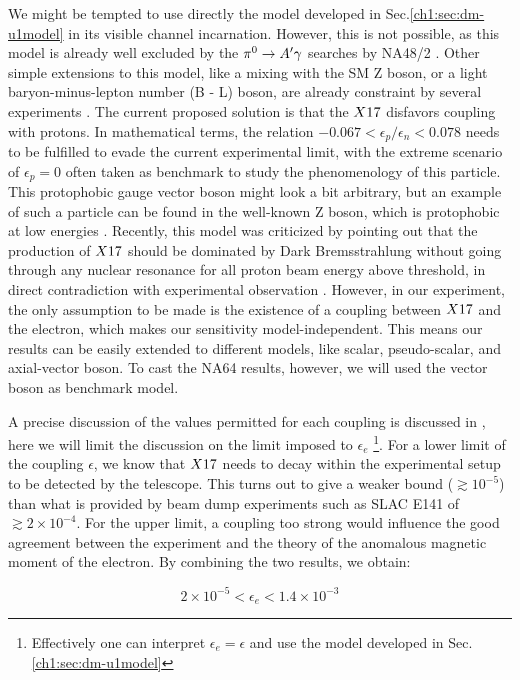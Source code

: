 We might be tempted to use directly the model developed in Sec.\ref{ch1:sec:dm-u1model} in its visible channel incarnation. However, this is not possible, as this model is already well excluded by the $\pi^0 \to A' \gamma$ searches by NA48/2 \cite{na48}. Other simple extensions to this model, like a mixing with the SM Z boson, or a light baryon-minus-lepton number (B - L) boson, are already constraint by several experiments \cite{PhysRevD.95.035017}. The current proposed solution is that the $X17$ disfavors coupling with protons. In mathematical terms, the relation $-0.067 < \epsilon_p/\epsilon_n < 0.078$ needs to be fulfilled to evade the current experimental limit, with the extreme scenario of $\epsilon_p = 0$ often taken as benchmark to study the phenomenology of this particle. This protophobic gauge vector boson might look a bit arbitrary, but an example of such a particle can be found in the well-known Z boson, which is protophobic at low energies \cite{PhysRevD.95.035017}. Recently, this model was criticized by pointing out that the production of $X17$ should be dominated by Dark Bremsstrahlung without going through any nuclear resonance for all proton beam energy above threshold, in direct contradiction with experimental observation \cite{zhang2020protophobic}.  However, in our experiment, the only assumption to be made is the existence of a coupling between $X17$ and the electron, which makes our sensitivity model-independent. This means our results can be easily extended to different models, like scalar, pseudo-scalar, and axial-vector boson. To cast the NA64 results, however, we will used the vector boson as benchmark model.

A precise discussion of the values permitted for each coupling is discussed in \cite{Feng:2016jff,PhysRevD.95.035017}, here we will limit the discussion on the limit imposed to $\epsilon_e$ \footnote{Effectively one can interpret $\epsilon_e = \epsilon$ and use the model developed in Sec.\ref{ch1:sec:dm-u1model}}. For a lower limit of the coupling $\epsilon$, we know that $X17$ needs to decay within the experimental setup to be detected by the telescope. This turns out to give a weaker bound ($\gtrsim 10^{-5}$) than what is provided by beam dump experiments such as SLAC E141 \cite{blum} of $\gtrsim 2 \times 10^{-4}$. For the upper limit, a coupling too strong would influence the good agreement between the experiment and the theory of the anomalous magnetic moment of the electron. By combining the two results, we obtain:

\begin{equation}
  \label{eq:x17-limits}
  2 \times 10^{-5} < \epsilon_e < 1.4 \times 10^{-3}
\end{equation}

